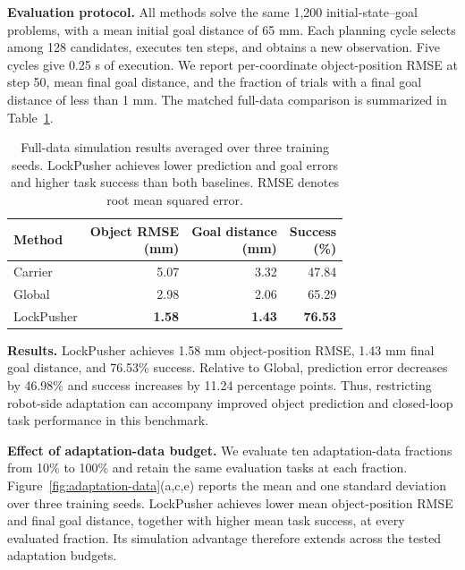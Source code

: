 \noindent\hspace*{1em}\textbf{Evaluation protocol.} All methods solve the same 1,200 initial-state--goal problems, with a mean initial goal distance of 65 mm. Each planning cycle selects among 128 candidates, executes ten steps, and obtains a new observation. Five cycles give 0.25 s of execution. We report per-coordinate object-position RMSE at step 50, mean final goal distance, and the fraction of trials with a final goal distance of less than 1 mm. The matched full-data comparison is summarized in Table~\ref{tab:core-results}.

\begin{table}[!tbp]\centering\small

\setlength{\tabcolsep}{4pt}
\begin{tabular}{lrrr}\toprule
Method & \shortstack{Object RMSE\\(mm)} & \shortstack{Goal distance\\(mm)} & \shortstack{Success\\(\%)}\\\midrule
Carrier &5.07&3.32&47.84\\
Global &2.98&2.06&65.29\\
LockPusher &\textbf{1.58}&\textbf{1.43}&\textbf{76.53}\\\bottomrule
\end{tabular}\caption{Full-data simulation results averaged over three training seeds. LockPusher achieves lower prediction and goal errors and higher task success than both baselines. RMSE denotes root mean squared error.}
\label{tab:core-results}
\end{table}
\noindent\hspace*{1em}\textbf{Results.} LockPusher achieves 1.58 mm object-position RMSE, 1.43 mm final goal distance, and 76.53\% success. Relative to Global, prediction error decreases by 46.98\% and success increases by 11.24 percentage points. Thus, restricting robot-side adaptation can accompany improved object prediction and closed-loop task performance in this benchmark.



\noindent\hspace*{1em}\textbf{Effect of adaptation-data budget.} We evaluate ten adaptation-data fractions from 10\% to 100\% and retain the same evaluation tasks at each fraction. Figure~\ref{fig:adaptation-data}(a,c,e) reports the mean and one standard deviation over three training seeds. LockPusher achieves lower mean object-position RMSE and final goal distance, together with higher mean task success, at every evaluated fraction. Its simulation advantage therefore extends across the tested adaptation budgets.

